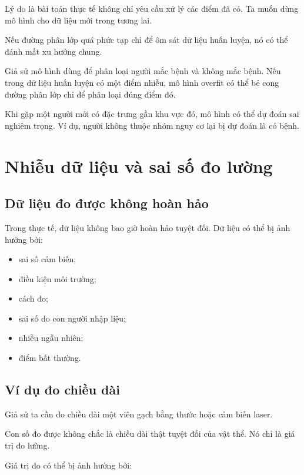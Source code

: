 Lý do là bài toán thực tế không chỉ yêu cầu xử lý các điểm đã có. Ta muốn dùng mô hình cho dữ liệu mới trong tương lai.

Nếu đường phân lớp quá phức tạp chỉ để ôm sát dữ liệu huấn luyện, nó có thể đánh mất xu hướng chung.

\begin{vidu}
Giả sử mô hình dùng để phân loại người mắc bệnh và không mắc bệnh. Nếu trong dữ liệu huấn luyện có một điểm nhiễu, mô hình overfit có thể bẻ cong đường phân lớp chỉ để phân loại đúng điểm đó.

Khi gặp một người mới có đặc trưng gần khu vực đó, mô hình có thể dự đoán sai nghiêm trọng. Ví dụ, người không thuộc nhóm nguy cơ lại bị dự đoán là có bệnh.
\end{vidu}

\section{Nhiễu dữ liệu và sai số đo lường}

\subsection{Dữ liệu đo được không hoàn hảo}

Trong thực tế, dữ liệu không bao giờ hoàn hảo tuyệt đối. Dữ liệu có thể bị ảnh hưởng bởi:

\begin{itemize}
    \item sai số cảm biến;
    \item điều kiện môi trường;
    \item cách đo;
    \item sai số do con người nhập liệu;
    \item nhiễu ngẫu nhiên;
    \item điểm bất thường.
\end{itemize}

\subsection{Ví dụ đo chiều dài}

Giả sử ta cần đo chiều dài một viên gạch bằng thước hoặc cảm biến laser.

Con số đo được không chắc là chiều dài thật tuyệt đối của vật thể. Nó chỉ là giá trị đo lường.

Giá trị đo có thể bị ảnh hưởng bởi:


